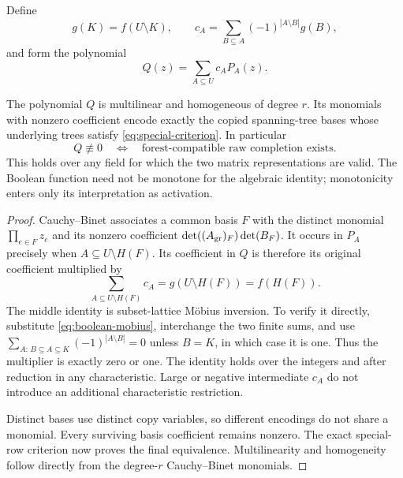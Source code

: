 Define
\begin{equation}\label{eq:boolean-mobius}
     g(K)=f(U\setminus K),\qquad
     c_A=\sum_{B\subseteq A}(-1)^{|A\setminus B|}g(B),
\end{equation}
and form the polynomial
\begin{equation}\label{eq:boolean-determinant-filter}
                        Q(z)=\sum_{A\subseteq U}c_A P_A(z).
\end{equation}

\begin{theorem}\label{thm:boolean-basis-sieve}
The polynomial $Q$ is multilinear and homogeneous of degree $r$.  Its
monomials with nonzero coefficient encode exactly the copied spanning-tree
bases whose underlying trees satisfy \eqref{eq:special-criterion}.
In particular
\[
              Q\not\equiv0
                \quad\Longleftrightarrow\quad
              \text{forest-compatible raw completion exists}.
\]
This holds over any field for which the two matrix representations are
valid.  The Boolean function need not be monotone for the algebraic
identity; monotonicity enters only its interpretation as activation.
\end{theorem}
\begin{proof}
Cauchy--Binet associates a common basis $F$ with the distinct monomial
$\prod_{e\in F}z_e$ and its nonzero coefficient
$\det((A_{\rm gr})_F)\det(B_F)$.  It occurs in $P_A$ precisely when
$A\subseteq U\setminus H(F)$.  Its coefficient in $Q$ is therefore its
original coefficient multiplied by
\[
          \sum_{A\subseteq U\setminus H(F)}c_A
             =g(U\setminus H(F))=f(H(F)).
\]
The middle identity is subset-lattice M\"obius inversion.  To verify it
directly, substitute \eqref{eq:boolean-mobius}, interchange the two finite
sums, and use
$\sum_{A:\,B\subseteq A\subseteq K}(-1)^{|A\setminus B|}=0$
unless $B=K$, in which case it is one.  Thus the multiplier is exactly
zero or one.  The identity holds over the integers and after reduction
in any characteristic.  Large or negative intermediate $c_A$ do not
introduce an additional characteristic restriction.

Distinct bases use distinct copy variables, so different encodings do
not share a monomial.  Every surviving basis coefficient remains nonzero.
The exact special-row criterion now proves the final equivalence.
Multilinearity and homogeneity follow directly from the degree-$r$
Cauchy--Binet monomials.
\end{proof}

